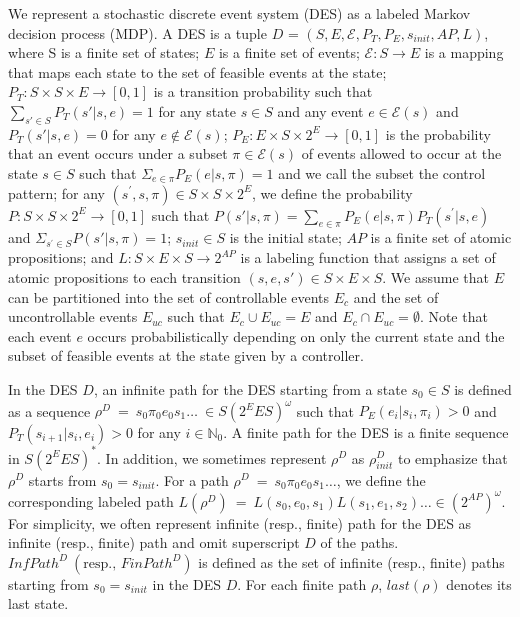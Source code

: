 \documentclass[a4j,12pt,oneside,openany,english]{jsbook}
\begin{document}
\begin{definition}
We represent a stochastic discrete event system (DES) as a labeled Markov decision process (MDP). A DES is a tuple $D$ = $(S, E, \mathcal{E}, P_T, P_E, s_{init}, AP, L)$, where S is a finite set of states; $E$ is a finite set of events; $\mathcal{E} : S \rightarrow E$ is a mapping that maps each state to the set of feasible events at the state; $P_T:S \times S \times E \rightarrow [0,1]$ is a transition probability such that $\sum_{s' \in S} P_T(s'|s,e) = 1$ for any state $s \in S$ and any event $e \in \mathcal{E}(s) $ and $P_T(s'|s,e) = 0$ for any $e \notin \mathcal{E}(s)$; $P_E : E \times S \times 2^E \rightarrow [0,1]$ is the probability that an event occurs under a subset $\pi \in \mathcal{E}(s)$ of events allowed to occur at the state $s \in S$ such that $\Sigma_{e \in \pi} P_E(e|s,\pi) = 1$ and we call the subset the control pattern; for any $(s^{\prime}, s, \pi) \in S \times S \times 2^E$, we define the probability $P : S \times S \times 2^{E} \rightarrow [0,1]$ such that $P(s'|s,\pi) = \sum_{e \in \pi}P_E(e|s,\pi) P_T(s^{\prime}|s,e)$ and $\Sigma_{s^{\prime} \in S} P(s'|s,\pi) = 1$; $s_{init} \in S$ is the initial state; $AP$ is a finite set of atomic propositions; and $L : S \times E \times S \rightarrow 2^{AP}$ is a labeling function that assigns a set of atomic propositions to each transition $(s, e, s') \in S \times E \times S$. We assume that $E$ can be partitioned into the set of controllable events $E_c$ and the set of uncontrollable events $E_{uc}$ such that $E_c \cup E_{uc} = E$ and $E_c \cap E_{uc} = \emptyset$. Note that each event $e$ occurs probabilistically depending on only the current state and the subset of feasible events at the state given by a controller.

In the DES $D$, an infinite path for the DES starting from a state $s_0 \in S$ is defined as a sequence $\rho^D\ =\ s_0\pi_0e_0s_1 \ldots\ \in S (2^E E S)^{\omega}$ such that $P_E(e_i|s_i, \pi_i) > 0$ and $P_T(s_{i+1}|s_i, e_i) > 0$ for any $ i \in \mathbb{N}_0$. A finite path for the DES is a finite sequence in $S (2^E E S)^*$. In addition, we sometimes represent $\rho^D$ as $\rho^D_{init}$ to emphasize that $\rho^D$ starts from $s_0 = s_{init}$.
For a path $\rho^D\ =\ s_0\pi_0e_0s_1 \ldots$, we define the corresponding labeled path $L(\rho^D)\ =\ L(s_0,e_0,s_1)L(s_1,e_1,s_2) \ldots \in (2^{AP})^{\omega}$.
For simplicity, we often represent infinite (resp., finite) path for the DES as infinite (resp., finite) path and omit superscript $D$ of the paths.
 $InfPath^{D}\ ( \text{resp., }FinPath^{D})$ is defined as the set of infinite (resp., finite) paths starting from $s_0=s_{init}$ in the DES $D$. For each finite path $\rho$, $last(\rho)$ denotes its last state.
\end{definition}
\end{document}
